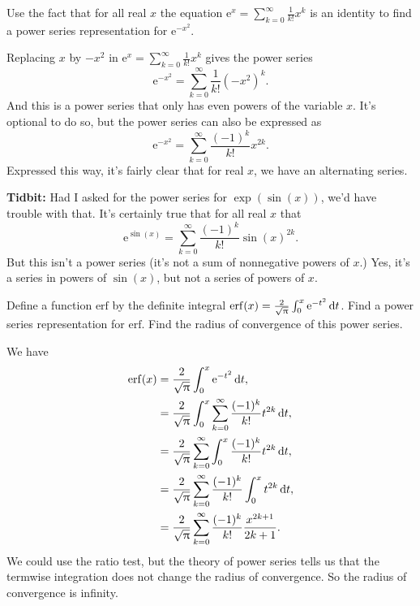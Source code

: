 \documentclass[12pt,fleqn]{exam}
\newcommand{\erf}{\mathrm{erf}}
\begin{document}
\begin{questions} 

\question [1] Use the fact that for all real $x$ the equation $\displaystyle \mathrm{e}^x = \sum_{k=0}^\infty \frac{1}{k!}  x^k$ is an identity 
 to find a power series representation for $\mathrm{e}^{-x^2} $.
\begin{solution}[2.5in]
Replacing $x$ by $-x^2$ in $\displaystyle \mathrm{e}^x = \sum_{k=0}^\infty \frac{1}{k!}  x^k$ gives the power series
\begin{equation*}
\mathrm{e}^{-x^2} = \sum_{k=0}^\infty \frac{1}{k!}  (-x^2)^k.
\end{equation*}
And this is a power series that only has even powers of the variable $x$. It's optional to do so, but the power series 
can also be expressed as
\begin{equation*}
\mathrm{e}^{-x^2} = \sum_{k=0}^\infty \frac{(-1)^k}{k!}  x^{2 k}.
\end{equation*}
Expressed this way, it's fairly clear that for real $x$, we have an alternating series.

\textbf{Tidbit:} Had I asked for the power series for $\exp(\sin(x))$, we'd have trouble with that. It's certainly 
true that for all real $x$ that
\begin{equation*}
  \mathrm{e}^{\sin(x)} = \sum_{k=0}^\infty \frac{(-1)^k}{k!}  \sin(x)^{2 k}.
\end{equation*}
But this isn't a power series (it's not a sum of nonnegative powers of $x$.) Yes, it's a series in powers of 
$\sin(x)$, but not a series of powers of $x$.
\end{solution}


\question [1] Define a function $\erf$ by the definite integral $\erf(x) = \frac{2}{\sqrt{\uppi}} \large \int_0^x \mathrm{e}^{-t^2} \, \mathrm{d} t$.
Find a power series representation for $\erf$.  Find the radius of convergence of this power series.
\begin{solution}%
We have
\begin{align*}
\erf(x) &= \frac{2}{\sqrt{\uppi}} \large \int_0^x \mathrm{e}^{-t^2} \, \mathrm{d} t, \\
            &= \frac{2}{\sqrt{\uppi}} \large \int_0^x \sum_{k=0}^\infty \frac{(-1)^k}{k!}  t^{2 k} \, \mathrm{d} t, \\
            &= \frac{2}{\sqrt{\uppi}}  \sum_{k=0}^\infty \large \int_0^x \frac{(-1)^k}{k!}  t^{2 k} \, \mathrm{d} t, \\
            &= \frac{2}{\sqrt{\uppi}}  \sum_{k=0}^\infty\frac{(-1)^k}{k!} \large \int_0^x   t^{2 k} \, \mathrm{d} t, \\
            &= \frac{2}{\sqrt{\uppi}}  \sum_{k=0}^\infty\frac{(-1)^k}{k!} \frac{x^{2 k+1}}{2 k + 1}.
\end{align*}
We could use the ratio test, but the theory of power series tells us that the termwise integration does not change
the radius of convergence. So the radius of convergence is infinity.
\end{solution}


\end{questions}
\end{document}
